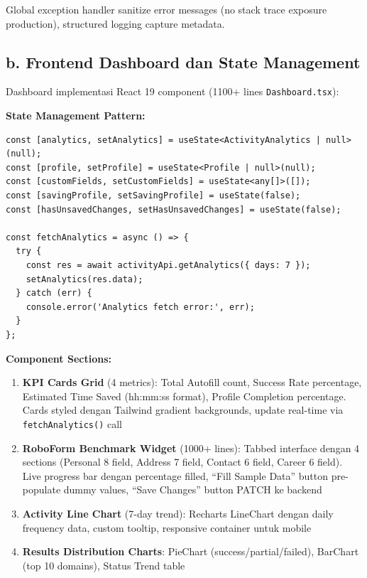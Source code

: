 \documentclass[12pt,a4paper]{article}
\begin{document}
Global exception handler sanitize error messages (no stack trace exposure production), structured logging capture metadata.

\subsection*{b. Frontend Dashboard dan State Management}

Dashboard implementasi React 19 component (1100+ lines \texttt{Dashboard.tsx}):

\textbf{State Management Pattern:}

\begin{lstlisting}
const [analytics, setAnalytics] = useState<ActivityAnalytics | null>(null);
const [profile, setProfile] = useState<Profile | null>(null);
const [customFields, setCustomFields] = useState<any[]>([]);
const [savingProfile, setSavingProfile] = useState(false);
const [hasUnsavedChanges, setHasUnsavedChanges] = useState(false);

const fetchAnalytics = async () => {
  try {
    const res = await activityApi.getAnalytics({ days: 7 });
    setAnalytics(res.data);
  } catch (err) {
    console.error('Analytics fetch error:', err);
  }
};
\end{lstlisting}

\textbf{Component Sections:}

\begin{enumerate}
  \item \textbf{KPI Cards Grid} (4 metrics): Total Autofill count, Success Rate percentage, Estimated Time Saved (hh:mm:ss format), Profile Completion percentage. Cards styled dengan Tailwind gradient backgrounds, update real-time via \texttt{fetchAnalytics()} call
  
  \item \textbf{RoboForm Benchmark Widget} (1000+ lines): Tabbed interface dengan 4 sections (Personal 8 field, Address 7 field, Contact 6 field, Career 6 field). Live progress bar dengan percentage filled, ``Fill Sample Data'' button pre-populate dummy values, ``Save Changes'' button PATCH ke backend
  
  \item \textbf{Activity Line Chart} (7-day trend): Recharts LineChart dengan daily frequency data, custom tooltip, responsive container untuk mobile
  
  \item \textbf{Results Distribution Charts}: PieChart (success/partial/failed), BarChart (top 10 domains), Status Trend table
\end{enumerate}
\end{document}
